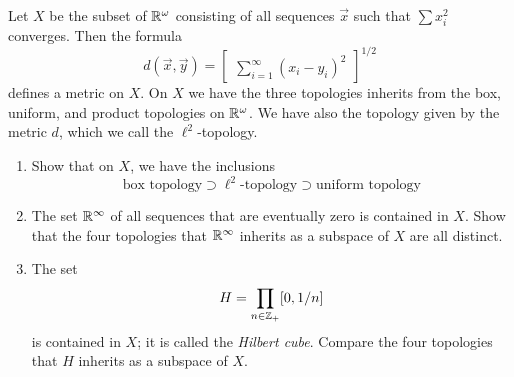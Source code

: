 \documentclass{article}
\newenvironment{problem}[2][Problem]{\begin{trivlist}
\item[\hskip \labelsep {\bfseries #1}\hskip \labelsep {\bfseries #2.}]}{\end{trivlist}}
\begin{document}
\begin{problem}{5}
	Let $ X $ be the subset of $ \mathbb{R}^\omega $ consisting of all sequences $ \vec{x} $ such that $ \sum x_i^2 $ converges. Then the formula
	\begin{equation}
		d(\vec{x},\vec{y}) = \begin{bmatrix}
\sum_{i=1}^{\infty}(x_i-y_i)^2
		\end{bmatrix}^{1/2}\nonumber
	\end{equation}
	defines a metric on $ X $. On $ X $ we have the three topologies inherits from the box, uniform, and product topologies on $ \mathbb{R}^\omega $. We have also the topology given by the metric $ d $, which we call the $ \ell^2 $-topology.
	\begin{enumerate}
		\item Show that on $ X $, we have the inclusions
		\begin{equation}
			\text{box topology}\supset \ell^2\text{-topology} \supset \text{uniform topology} \nonumber
		\end{equation}
		\item The set $ \mathbb{R}^\infty $ of all sequences that are eventually zero is contained in $ X $. Show that the four topologies that $ \mathbb{R}^\infty $ inherits as a subspace of $ X $ are all distinct.
		\item The set
		\begin{equation}
			H = \prod_{n \in \mathbb{Z}_+}[0,1/n] \nonumber
		\end{equation}
		is contained in $ X $; it is called the \textit{Hilbert cube}. Compare the four topologies that $ H $ inherits as a subspace of $ X $.
	\end{enumerate}
\end{problem}
\end{document}
